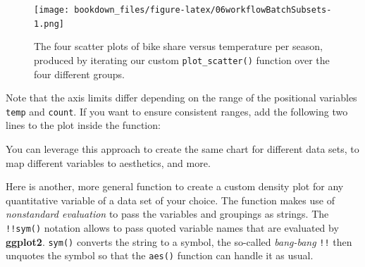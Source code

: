 \documentclass[
]{krantz}
\makeatletter
\newenvironment{Shaded}{\begin{snugshade}}{\end{snugshade}}
\newcommand{\AttributeTok}[1]{\textcolor[rgb]{0.27,0.27,0.27}{#1}}
\newcommand{\DocumentationTok}[1]{\textcolor[rgb]{0.37,0.37,0.37}{\textbf{\textit{#1}}}}
\newcommand{\FunctionTok}[1]{\textcolor[rgb]{0.27,0.27,0.27}{\textbf{#1}}}
\newcommand{\NormalTok}[1]{#1}
\newcommand{\SpecialCharTok}[1]{\textcolor[rgb]{0.43,0.43,0.43}{\textbf{#1}}}
\newenvironment{kframe}{%
\medskip{}
\setlength{\fboxsep}{.8em}
 \def\at@end@of@kframe{}%
 \ifinner\ifhmode%
  \def\at@end@of@kframe{\end{minipage}}%
  \begin{minipage}{\columnwidth}%
 \fi\fi%
 \def\FrameCommand##1{\hskip\@totalleftmargin \hskip-\fboxsep
 \colorbox{shadecolor}{##1}\hskip-\fboxsep
     \hskip-\linewidth \hskip-\@totalleftmargin \hskip\columnwidth}%
 \MakeFramed {\advance\hsize-\width
   \@totalleftmargin\z@ \linewidth\hsize
   \@setminipage}}%
 {\par\unskip\endMakeFramed%
 \at@end@of@kframe}
\renewenvironment{Shaded}{\begin{kframe}}{\end{kframe}}
\makeatother
\begin{document}
\begin{Shaded}
\end{Shaded}

\begin{figure}
\centering
\texttt{[image: bookdown\_files/figure-latex/06workflowBatchSubsets-1.png]}
\caption{\label{fig:06workflowBatchSubsets}The four scatter plots of bike share versus temperature per season, produced by iterating our custom \texttt{plot\_scatter()} function over the four different groups.}
\end{figure}

Note that the axis limits differ depending on the range of the positional variables \texttt{temp} and \texttt{count}. If you want to ensure consistent ranges, add the following two lines to the plot inside the function:

\begin{Shaded}
\end{Shaded}

You can leverage this approach to create the same chart for different data sets, to map different variables to aesthetics, and more.

Here is another, more general function to create a custom density plot for any quantitative variable of a data set of your choice. The function makes use of \emph{nonstandard evaluation} to pass the variables and groupings as strings. The \texttt{!!sym()} notation allows to pass quoted variable names that are evaluated by \textbf{ggplot2}. \texttt{sym()} converts the string to a symbol, the so-called \emph{bang-bang} \texttt{!!} then unquotes the symbol so that the \texttt{aes()} function can handle it as usual.
\end{document}
